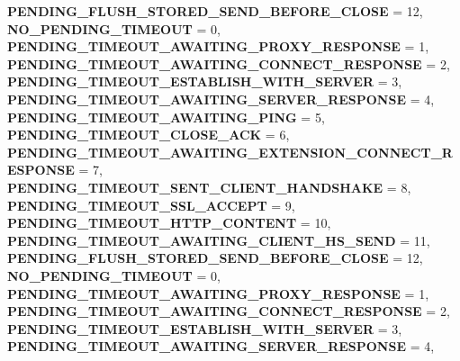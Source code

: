 \begin{DoxyCompactItemize}
{\bfseries P\+E\+N\+D\+I\+N\+G\+\_\+\+F\+L\+U\+S\+H\+\_\+\+S\+T\+O\+R\+E\+D\+\_\+\+S\+E\+N\+D\+\_\+\+B\+E\+F\+O\+R\+E\+\_\+\+C\+L\+O\+SE} = 12, 
{\bfseries N\+O\+\_\+\+P\+E\+N\+D\+I\+N\+G\+\_\+\+T\+I\+M\+E\+O\+UT} = 0, 
\newline
{\bfseries P\+E\+N\+D\+I\+N\+G\+\_\+\+T\+I\+M\+E\+O\+U\+T\+\_\+\+A\+W\+A\+I\+T\+I\+N\+G\+\_\+\+P\+R\+O\+X\+Y\+\_\+\+R\+E\+S\+P\+O\+N\+SE} = 1, 
{\bfseries P\+E\+N\+D\+I\+N\+G\+\_\+\+T\+I\+M\+E\+O\+U\+T\+\_\+\+A\+W\+A\+I\+T\+I\+N\+G\+\_\+\+C\+O\+N\+N\+E\+C\+T\+\_\+\+R\+E\+S\+P\+O\+N\+SE} = 2, 
{\bfseries P\+E\+N\+D\+I\+N\+G\+\_\+\+T\+I\+M\+E\+O\+U\+T\+\_\+\+E\+S\+T\+A\+B\+L\+I\+S\+H\+\_\+\+W\+I\+T\+H\+\_\+\+S\+E\+R\+V\+ER} = 3, 
{\bfseries P\+E\+N\+D\+I\+N\+G\+\_\+\+T\+I\+M\+E\+O\+U\+T\+\_\+\+A\+W\+A\+I\+T\+I\+N\+G\+\_\+\+S\+E\+R\+V\+E\+R\+\_\+\+R\+E\+S\+P\+O\+N\+SE} = 4, 
\newline
{\bfseries P\+E\+N\+D\+I\+N\+G\+\_\+\+T\+I\+M\+E\+O\+U\+T\+\_\+\+A\+W\+A\+I\+T\+I\+N\+G\+\_\+\+P\+I\+NG} = 5, 
{\bfseries P\+E\+N\+D\+I\+N\+G\+\_\+\+T\+I\+M\+E\+O\+U\+T\+\_\+\+C\+L\+O\+S\+E\+\_\+\+A\+CK} = 6, 
{\bfseries P\+E\+N\+D\+I\+N\+G\+\_\+\+T\+I\+M\+E\+O\+U\+T\+\_\+\+A\+W\+A\+I\+T\+I\+N\+G\+\_\+\+E\+X\+T\+E\+N\+S\+I\+O\+N\+\_\+\+C\+O\+N\+N\+E\+C\+T\+\_\+\+R\+E\+S\+P\+O\+N\+SE} = 7, 
{\bfseries P\+E\+N\+D\+I\+N\+G\+\_\+\+T\+I\+M\+E\+O\+U\+T\+\_\+\+S\+E\+N\+T\+\_\+\+C\+L\+I\+E\+N\+T\+\_\+\+H\+A\+N\+D\+S\+H\+A\+KE} = 8, 
\newline
{\bfseries P\+E\+N\+D\+I\+N\+G\+\_\+\+T\+I\+M\+E\+O\+U\+T\+\_\+\+S\+S\+L\+\_\+\+A\+C\+C\+E\+PT} = 9, 
{\bfseries P\+E\+N\+D\+I\+N\+G\+\_\+\+T\+I\+M\+E\+O\+U\+T\+\_\+\+H\+T\+T\+P\+\_\+\+C\+O\+N\+T\+E\+NT} = 10, 
{\bfseries P\+E\+N\+D\+I\+N\+G\+\_\+\+T\+I\+M\+E\+O\+U\+T\+\_\+\+A\+W\+A\+I\+T\+I\+N\+G\+\_\+\+C\+L\+I\+E\+N\+T\+\_\+\+H\+S\+\_\+\+S\+E\+ND} = 11, 
{\bfseries P\+E\+N\+D\+I\+N\+G\+\_\+\+F\+L\+U\+S\+H\+\_\+\+S\+T\+O\+R\+E\+D\+\_\+\+S\+E\+N\+D\+\_\+\+B\+E\+F\+O\+R\+E\+\_\+\+C\+L\+O\+SE} = 12, 
\newline
{\bfseries N\+O\+\_\+\+P\+E\+N\+D\+I\+N\+G\+\_\+\+T\+I\+M\+E\+O\+UT} = 0, 
{\bfseries P\+E\+N\+D\+I\+N\+G\+\_\+\+T\+I\+M\+E\+O\+U\+T\+\_\+\+A\+W\+A\+I\+T\+I\+N\+G\+\_\+\+P\+R\+O\+X\+Y\+\_\+\+R\+E\+S\+P\+O\+N\+SE} = 1, 
{\bfseries P\+E\+N\+D\+I\+N\+G\+\_\+\+T\+I\+M\+E\+O\+U\+T\+\_\+\+A\+W\+A\+I\+T\+I\+N\+G\+\_\+\+C\+O\+N\+N\+E\+C\+T\+\_\+\+R\+E\+S\+P\+O\+N\+SE} = 2, 
{\bfseries P\+E\+N\+D\+I\+N\+G\+\_\+\+T\+I\+M\+E\+O\+U\+T\+\_\+\+E\+S\+T\+A\+B\+L\+I\+S\+H\+\_\+\+W\+I\+T\+H\+\_\+\+S\+E\+R\+V\+ER} = 3, 
\newline
{\bfseries P\+E\+N\+D\+I\+N\+G\+\_\+\+T\+I\+M\+E\+O\+U\+T\+\_\+\+A\+W\+A\+I\+T\+I\+N\+G\+\_\+\+S\+E\+R\+V\+E\+R\+\_\+\+R\+E\+S\+P\+O\+N\+SE} = 4, 

\end{DoxyCompactItemize}

